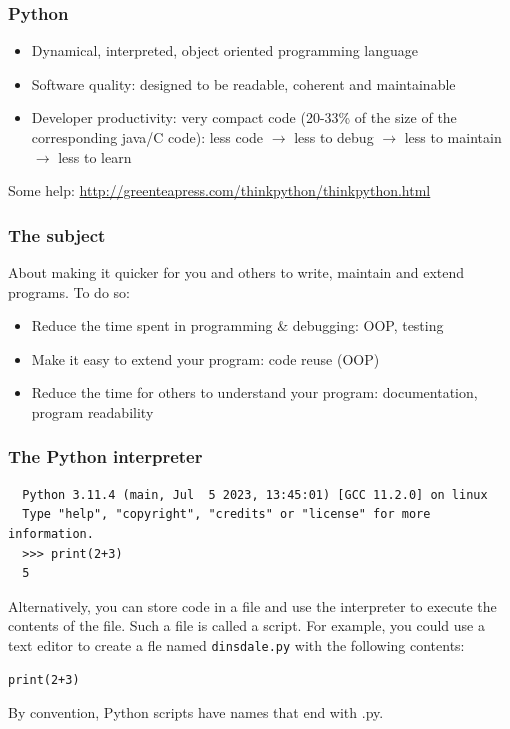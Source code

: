 \documentclass{beamer}
\begin{document}
\begin{frame}
\frametitle{Python}
\begin{itemize}
\item Dynamical, interpreted, object oriented programming language
\item Software quality: designed to be readable, coherent and maintainable
\item Developer productivity: very compact code (20-33\% of the size of the corresponding java/C code): less code $\rightarrow$ less to debug $\rightarrow$ less to maintain $\rightarrow$ less to learn
\end{itemize}
Some help: \url{http://greenteapress.com/thinkpython/thinkpython.html}
\end{frame}

\begin{frame}
\frametitle{The subject}
About making it quicker for you and others to write, maintain and extend programs. To do so:
\begin{itemize}
\item Reduce the time spent in programming \& debugging: OOP, testing
\item Make it easy to extend your program: code reuse (OOP)
\item Reduce the time for others to understand your program: documentation, program readability
\end{itemize}
\end{frame}

\begin{frame}[containsverbatim]
\frametitle{The Python interpreter}
\begin{Verbatim}
  Python 3.11.4 (main, Jul  5 2023, 13:45:01) [GCC 11.2.0] on linux
  Type "help", "copyright", "credits" or "license" for more information.
  >>> print(2+3)
  5
\end{Verbatim}
Alternatively, you can store code in a file and use the interpreter to execute the contents of the file. Such a file is called a script. For example, you could use a text editor to create a fle named \texttt{dinsdale.py} with the following contents: 
\begin{lstlisting}
print(2+3) 
\end{lstlisting}
By convention, Python scripts have names that end with .py. 
\end{frame}
\end{document}
